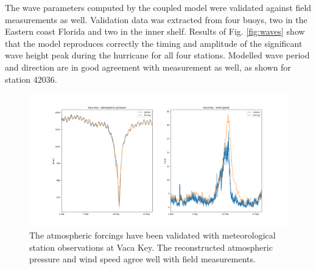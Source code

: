 \documentclass[11pt,a4paper]{article}
\begin{document}
The wave parameters computed by the coupled model were validated against field measurements as well. Validation data was extracted from four buoys, two in the Eastern coast Florida and two in the inner shelf. Results of Fig. \ref{fig:waves} show that the model reproduces correctly the timing and amplitude of the significant wave height peak during the hurricane for all four stations. Modelled wave period and direction are in good agreement with measurement as well, as shown for station 42036. 


\begin{figure}
    \centering
    \includegraphics[width=.95\textwidth]{fig/validation_met.png}
    \caption{The atmospheric forcings have been validated with meteorological station observations at Vaca Key. The reconstructed atmospheric pressure and wind speed agree well with field measurements.}
    \label{fig:forcings}
\end{figure}
\end{document}
